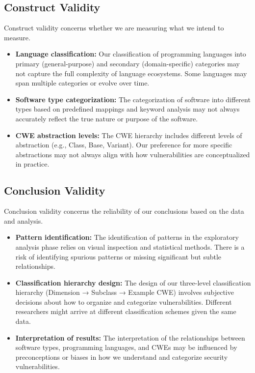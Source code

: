 \subsection{Construct Validity}

Construct validity concerns whether we are measuring what we intend to measure.

\begin{itemize}
    \item \textbf{Language classification:} Our classification of programming languages into primary (general-purpose) and secondary (domain-specific) categories may not capture the full complexity of language ecosystems. Some languages may span multiple categories or evolve over time.

    \item \textbf{Software type categorization:} The categorization of software into different types based on predefined mappings and keyword analysis may not always accurately reflect the true nature or purpose of the software.

    \item \textbf{CWE abstraction levels:} The CWE hierarchy includes different levels of abstraction (e.g., Class, Base, Variant). Our preference for more specific abstractions may not always align with how vulnerabilities are conceptualized in practice.
\end{itemize}

\subsection{Conclusion Validity}

Conclusion validity concerns the reliability of our conclusions based on the data and analysis.

\begin{itemize}
    \item \textbf{Pattern identification:} The identification of patterns in the exploratory analysis phase relies on visual inspection and statistical methods. There is a risk of identifying spurious patterns or missing significant but subtle relationships.

    \item \textbf{Classification hierarchy design:} The design of our three-level classification hierarchy (Dimension → Subclass → Example CWE) involves subjective decisions about how to organize and categorize vulnerabilities. Different researchers might arrive at different classification schemes given the same data.

    \item \textbf{Interpretation of results:} The interpretation of the relationships between software types, programming languages, and CWEs may be influenced by preconceptions or biases in how we understand and categorize security vulnerabilities.
\end{itemize}

